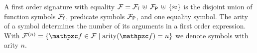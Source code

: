 
\begin{definition}\label{def:signature}
A 
first order 
{\myem signature} with equality
${\mathcal F} = {{\mathcal F}_{\mathsf f}}\,\uplus\,{{\mathcal F}_{\mathsf P}}\,\uplus\,\{\approx\}$ 
is the disjoint union of 
{\myem function symbols} ${{\mathcal F}_{\mathsf f}}$, 
{\myem predicate symbols} ${{\mathcal F}_{\mathsf P}}$,
and one equality symbol.
%
The {\myem arity} of a symbol determines the number of its arguments in a first order expression.
With $\mcFn = \{ \mcf\in\mcF \mid \arity(\mcf) = n \}$ we denote symbols with arity $n$.
\end{definition}
